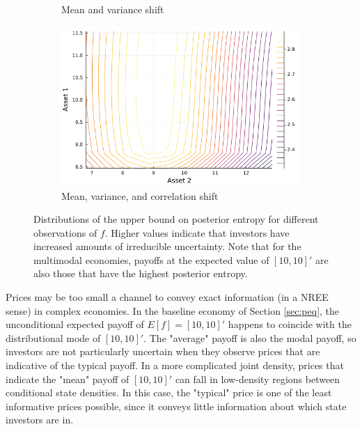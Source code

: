 \documentclass{article}
\begin{document}
\begin{figure}
\begin{subfigure}{0.4\textwidth}
        \caption{Mean and variance shift}
    \end{subfigure}
    \begin{subfigure}{0.4\textwidth}
        \includegraphics[width=\textwidth]{../plots/params/more-corr-meanvarshift/entropy_upper.png}
        \caption{Mean, variance, and correlation shift}
    \end{subfigure}
    \caption{Distributions of the upper bound on posterior entropy for different observations of $f$. Higher values indicate that investors have increased amounts of irreducible uncertainty. Note that for the multimodal economies, payoffs at the expected value of $[10,10]'$ are also those that have the highest posterior entropy.}
    \label{fig:entropy_upper}
\end{figure}

Prices may be too small a channel to convey exact information (in a NREE sense) in complex economies. In the baseline economy of Section \ref{sec:peq}, the unconditional expected payoff of $E[f] = [10,10]'$ happens to coincide with the distributional mode of $[10,10]'$. The "average" payoff is also the modal payoff, so investors are not particularly uncertain when they observe prices that are indicative of the typical payoff. In a more complicated joint density, prices that indicate the "mean" payoff of $[10,10]'$ can fall in low-density regions between conditional state densities. In this case, the "typical" price is one of the least informative prices possible, since it conveys little information about which state investors are in. 
\end{document}
